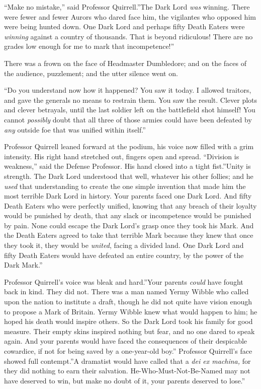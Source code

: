 ``Make no mistake,'' said Professor Quirrell.''The Dark Lord \emph{was}
winning. There were fewer and fewer Aurors who dared face him, the
vigilantes who opposed him were being hunted down. One Dark Lord and
perhaps fifty Death Eaters were \emph{winning} against a country of
thousands. That is beyond ridiculous! There are no grades low enough for
me to mark that incompetence!''

There was a frown on the face of Headmaster Dumbledore; and on the faces
of the audience, puzzlement; and the utter silence went on.

``Do you understand now how it happened? You saw it today. I allowed
traitors, and gave the generals no means to restrain them. You saw the
result. Clever plots and clever betrayals, until the last soldier left
on the battlefield shot himself! You cannot \emph{possibly} doubt that
all three of those armies could have been defeated by \emph{any} outside
foe that was unified within itself.''

Professor Quirrell leaned forward at the podium, his voice now filled
with a grim intensity. His right hand stretched out, fingers open and
spread. ``Division is weakness,'' said the Defense Professor. His hand
closed into a tight fist.''Unity is strength. The Dark Lord understood
that well, whatever his other follies; and he \emph{used} that
understanding to create the one simple invention that made him the most
terrible Dark Lord in history. Your parents faced one Dark Lord. And
fifty Death Eaters who were perfectly unified, knowing that any breach
of their loyalty would be punished by death, that any slack or
incompetence would be punished by pain. None could escape the Dark
Lord's grasp once they took his Mark. And the Death Eaters agreed to
take that terrible Mark because they knew that once they took it, they
would be \emph{united}, facing a divided land. One Dark Lord and fifty
Death Eaters would have defeated an entire country, by the power of the
Dark Mark.''

Professor Quirrell's voice was bleak and hard.''Your parents
\emph{could} have fought back in kind. They did not. There was a man
named Yermy Wibble who called upon the nation to institute a draft,
though he did not quite have vision enough to propose a Mark of Britain.
Yermy Wibble knew what would happen to him; he hoped his death would
inspire others. So the Dark Lord took his family for good measure. Their
empty skins inspired nothing but fear, and no one dared to speak again.
And your parents would have faced the consequences of their despicable
cowardice, if not for being saved by a one-year-old boy.'' Professor
Quirrell's face showed full contempt.''A dramatist would have called
that a \emph{dei ex machina,} for they did nothing to earn their
salvation. He-Who-Must-Not-Be-Named may not have deserved to win, but
make no doubt of it, your parents deserved to lose.''

